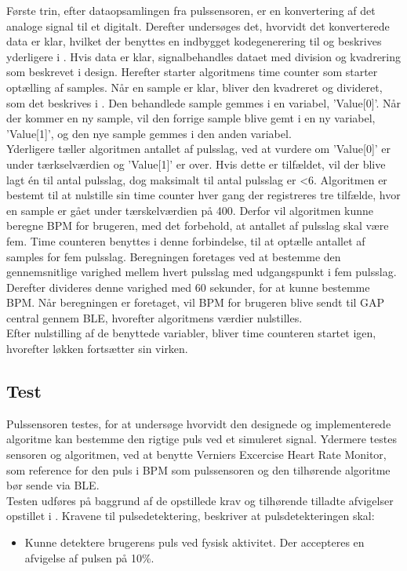 Første trin, efter dataopsamlingen fra pulssensoren, er en konvertering af det analoge signal til et digitalt. Derefter undersøges det, hvorvidt det konverterede data er klar, hvilket der benyttes en indbygget kodegenerering til og beskrives yderligere i . Hvis data er klar, signalbehandles dataet med division og kvadrering som beskrevet i design. Herefter starter algoritmens time counter som starter optælling af samples. Når en sample er klar, bliver den kvadreret og divideret, som det beskrives i . Den behandlede sample gemmes i en variabel, 'Value[0]'. Når der kommer en ny sample, vil den forrige sample blive gemt i en ny variabel, 'Value[1]', og den nye sample gemmes i den anden variabel. \\
Yderligere tæller algoritmen antallet af pulsslag, ved at vurdere om 'Value[0]' er under tærkselværdien og 'Value[1]' er over. Hvis dette er tilfældet, vil der blive lagt én til antal pulsslag, dog maksimalt til antal pulsslag er <6. Algoritmen er bestemt til at nulstille sin time counter hver gang der registreres tre tilfælde, hvor en sample er gået under tærskelværdien på 400. Derfor vil algoritmen kunne beregne BPM for brugeren, med det forbehold, at antallet af pulsslag skal være fem. Time counteren benyttes i denne forbindelse, til at optælle antallet af samples for fem pulsslag. Beregningen foretages ved at bestemme den gennemsnitlige varighed mellem hvert pulsslag med udgangspunkt i fem pulsslag. Derefter divideres denne varighed med 60 sekunder, for at kunne bestemme BPM. Når beregningen er foretaget, vil BPM for brugeren blive sendt til GAP central gennem BLE, hvorefter algoritmens værdier nulstilles.\\
Efter nulstilling af de benyttede variabler, bliver time counteren startet igen, hvorefter løkken fortsætter sin virken.


\subsection{Test}
Pulssensoren testes, for at undersøge hvorvidt den designede og implementerede algoritme kan bestemme den rigtige puls ved et simuleret signal. Ydermere testes sensoren og algoritmen, ved at benytte Verniers Excercise Heart Rate Monitor, som reference for den puls i BPM som pulssensoren og den tilhørende algoritme bør sende via BLE. \\
Testen udføres på baggrund af
de opstillede krav og tilhørende tilladte afvigelser opstillet i . Kravene til pulsedetektering, beskriver at pulsdetekteringen skal:
\begin{itemize}
	\item Kunne detektere brugerens puls ved fysisk aktivitet. Der accepteres en afvigelse af pulsen på 10\%.
\end{itemize}

